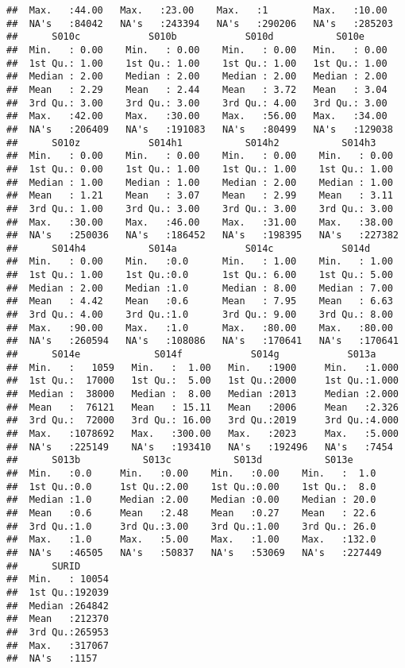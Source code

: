 \documentclass[
]{article}
\begin{document}
\begin{verbatim}
##  Max.   :44.00   Max.   :23.00    Max.   :1        Max.   :10.00   
##  NA's   :84042   NA's   :243394   NA's   :290206   NA's   :285203  
##      S010c            S010b            S010d           S010e       
##  Min.   : 0.00    Min.   : 0.00    Min.   : 0.00   Min.   : 0.00   
##  1st Qu.: 1.00    1st Qu.: 1.00    1st Qu.: 1.00   1st Qu.: 1.00   
##  Median : 2.00    Median : 2.00    Median : 2.00   Median : 2.00   
##  Mean   : 2.29    Mean   : 2.44    Mean   : 3.72   Mean   : 3.04   
##  3rd Qu.: 3.00    3rd Qu.: 3.00    3rd Qu.: 4.00   3rd Qu.: 3.00   
##  Max.   :42.00    Max.   :30.00    Max.   :56.00   Max.   :34.00   
##  NA's   :206409   NA's   :191083   NA's   :80499   NA's   :129038  
##      S010z            S014h1           S014h2           S014h3      
##  Min.   : 0.00    Min.   : 0.00    Min.   : 0.00    Min.   : 0.00   
##  1st Qu.: 0.00    1st Qu.: 1.00    1st Qu.: 1.00    1st Qu.: 1.00   
##  Median : 1.00    Median : 1.00    Median : 2.00    Median : 1.00   
##  Mean   : 1.21    Mean   : 3.07    Mean   : 2.99    Mean   : 3.11   
##  3rd Qu.: 1.00    3rd Qu.: 3.00    3rd Qu.: 3.00    3rd Qu.: 3.00   
##  Max.   :30.00    Max.   :46.00    Max.   :31.00    Max.   :38.00   
##  NA's   :250036   NA's   :186452   NA's   :198395   NA's   :227382  
##      S014h4           S014a            S014c            S014d       
##  Min.   : 0.00    Min.   :0.0      Min.   : 1.00    Min.   : 1.00   
##  1st Qu.: 1.00    1st Qu.:0.0      1st Qu.: 6.00    1st Qu.: 5.00   
##  Median : 2.00    Median :1.0      Median : 8.00    Median : 7.00   
##  Mean   : 4.42    Mean   :0.6      Mean   : 7.95    Mean   : 6.63   
##  3rd Qu.: 4.00    3rd Qu.:1.0      3rd Qu.: 9.00    3rd Qu.: 8.00   
##  Max.   :90.00    Max.   :1.0      Max.   :80.00    Max.   :80.00   
##  NA's   :260594   NA's   :108086   NA's   :170641   NA's   :170641  
##      S014e             S014f            S014g            S013a      
##  Min.   :   1059   Min.   :  1.00   Min.   :1900     Min.   :1.000  
##  1st Qu.:  17000   1st Qu.:  5.00   1st Qu.:2000     1st Qu.:1.000  
##  Median :  38000   Median :  8.00   Median :2013     Median :2.000  
##  Mean   :  76121   Mean   : 15.11   Mean   :2006     Mean   :2.326  
##  3rd Qu.:  72000   3rd Qu.: 16.00   3rd Qu.:2019     3rd Qu.:4.000  
##  Max.   :1078692   Max.   :300.00   Max.   :2023     Max.   :5.000  
##  NA's   :225149    NA's   :193410   NA's   :192496   NA's   :7454   
##      S013b           S013c           S013d           S013e       
##  Min.   :0.0     Min.   :0.00    Min.   :0.00    Min.   :  1.0   
##  1st Qu.:0.0     1st Qu.:2.00    1st Qu.:0.00    1st Qu.:  8.0   
##  Median :1.0     Median :2.00    Median :0.00    Median : 20.0   
##  Mean   :0.6     Mean   :2.48    Mean   :0.27    Mean   : 22.6   
##  3rd Qu.:1.0     3rd Qu.:3.00    3rd Qu.:1.00    3rd Qu.: 26.0   
##  Max.   :1.0     Max.   :5.00    Max.   :1.00    Max.   :132.0   
##  NA's   :46505   NA's   :50837   NA's   :53069   NA's   :227449  
##      SURID       
##  Min.   : 10054  
##  1st Qu.:192039  
##  Median :264842  
##  Mean   :212370  
##  3rd Qu.:265953  
##  Max.   :317067  
##  NA's   :1157
\end{verbatim}
\end{document}
